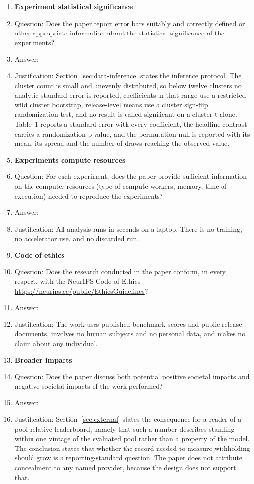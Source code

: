 \begin{enumerate}
\item {\bf Experiment statistical significance}
    \item[] Question: Does the paper report error bars suitably and correctly defined or other appropriate information about the statistical significance of the experiments?
    \item[] Answer: \answerYes{}
    \item[] Justification: Section~\ref{sec:data-inference} states the inference protocol. The cluster count is small and unevenly distributed, so below twelve clusters no analytic standard error is reported, coefficients in that range use a restricted wild cluster bootstrap, release-level means use a cluster sign-flip randomization test, and no result is called significant on a cluster-t alone. Table~1 reports a standard error with every coefficient, the headline contrast carries a randomization p-value, and the permutation null is reported with its mean, its spread and the number of draws reaching the observed value.


\item {\bf Experiments compute resources}
    \item[] Question: For each experiment, does the paper provide sufficient information on the computer resources (type of compute workers, memory, time of execution) needed to reproduce the experiments?
    \item[] Answer: \answerYes{}
    \item[] Justification: All analysis runs in seconds on a laptop. There is no training, no accelerator use, and no discarded run.


\item {\bf Code of ethics}
    \item[] Question: Does the research conducted in the paper conform, in every respect, with the NeurIPS Code of Ethics \url{https://neurips.cc/public/EthicsGuidelines}?
    \item[] Answer: \answerYes{}
    \item[] Justification: The work uses published benchmark scores and public release documents, involves no human subjects and no personal data, and makes no claim about any individual.



\item {\bf Broader impacts}
    \item[] Question: Does the paper discuss both potential positive societal impacts and negative societal impacts of the work performed?
    \item[] Answer: \answerYes{}
    \item[] Justification: Section~\ref{sec:external} states the consequence for a reader of a pool-relative leaderboard, namely that such a number describes standing within one vintage of the evaluated pool rather than a property of the model. The conclusion states that whether the record needed to measure withholding should grow is a reporting-standard question. The paper does not attribute concealment to any named provider, because the design does not support that.



\end{enumerate}
